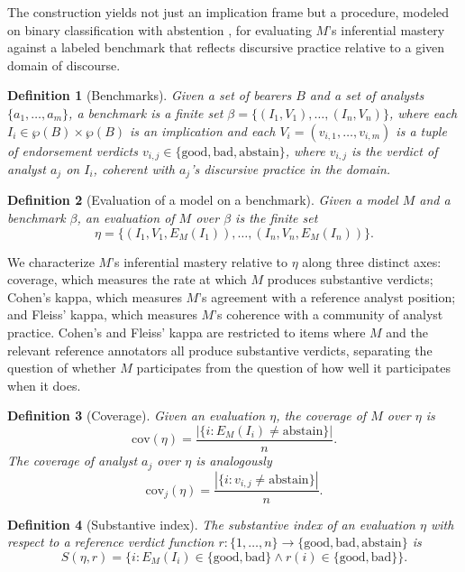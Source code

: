 \documentclass[11pt]{article}
\newtheorem{definition}{Definition}
\begin{document}
The construction yields not just an implication frame but a procedure, modeled on binary classification with abstention \cite{el-yaniv2010}, for evaluating $M$'s inferential mastery against a labeled benchmark that reflects discursive practice relative to a given domain of discourse.

\begin{definition}[Benchmarks]
Given a set of bearers $B$ and a set of analysts $\{a_1, \ldots, a_m\}$, a benchmark is a finite set $\beta = \{(I_1, V_1), \ldots, (I_n, V_n)\}$, where each $I_i \in \wp(B) \times \wp(B)$ is an implication and each $V_i = (v_{i,1}, \ldots, v_{i,m})$ is a tuple of endorsement verdicts $v_{i,j} \in \{\mathrm{good}, \mathrm{bad}, \mathrm{abstain}\}$, where $v_{i,j}$ is the verdict of analyst $a_j$ on $I_i$, coherent with $a_j$'s discursive practice in the domain.
\end{definition}

\begin{definition}[Evaluation of a model on a benchmark]
Given a model $M$ and a benchmark $\beta$, an evaluation of $M$ over $\beta$ is the finite set
\[
\eta = \{(I_1, V_1, E_M(I_1)), \ldots, (I_n, V_n, E_M(I_n))\}.
\]
\end{definition}

We characterize $M$'s inferential mastery relative to $\eta$ along three distinct axes: coverage, which measures the rate at which $M$ produces substantive verdicts; Cohen's kappa, which measures $M$'s agreement with a reference analyst position; and Fleiss' kappa, which measures $M$'s coherence with a community of analyst practice. Cohen's and Fleiss' kappa are restricted to items where $M$ and the relevant reference annotators all produce substantive verdicts, separating the question of whether $M$ participates from the question of how well it participates when it does.

\begin{definition}[Coverage]
Given an evaluation $\eta$, the coverage of $M$ over $\eta$ is
\[
\mathrm{cov}(\eta) = \frac{|\{i : E_M(I_i) \neq \mathrm{abstain}\}|}{n}.
\]
The coverage of analyst $a_j$ over $\eta$ is analogously
\[
\mathrm{cov}_j(\eta) = \frac{|\{i : v_{i,j} \neq \mathrm{abstain}\}|}{n}.
\]
\end{definition}

\begin{definition}[Substantive index]
The substantive index of an evaluation $\eta$ with respect to a reference verdict function $r : \{1, \ldots, n\} \to \{\mathrm{good}, \mathrm{bad}, \mathrm{abstain}\}$ is
\[
S(\eta, r) = \{i : E_M(I_i) \in \{\mathrm{good}, \mathrm{bad}\} \wedge r(i) \in \{\mathrm{good}, \mathrm{bad}\}\}.
\]
\end{definition}
\end{document}
